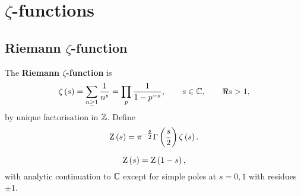 \pagebreak

\section{\texorpdfstring{$ \zeta $}{Zeta}-functions}

\subsection{Riemann \texorpdfstring{$ \zeta $}{zeta}-function}


The \textbf{Riemann $ \zeta $-function} is
$$ \zeta\br{s} = \sum_{n \ge 1} \dfrac{1}{n^s} = \prod_p \dfrac{1}{1 - p^{-s}}, \qquad s \in \CC, \qquad \Re s > 1, $$
by unique factorisation in $ \mathbb{Z} $. Define
$$ \Z\br{s} = \pi^{-\tfrac{s}{2}}\Gamma\br{\dfrac{s}{2}}\zeta\br{s}. $$

\begin{theorem}
\label{thm:9.1}
$$ \Z\br{s} = \Z\br{1 - s}, $$
with analytic continuation to $ \mathbb{C} $ except for simple poles at $ s = 0, 1 $ with residues $ \pm 1 $.
\end{theorem}

